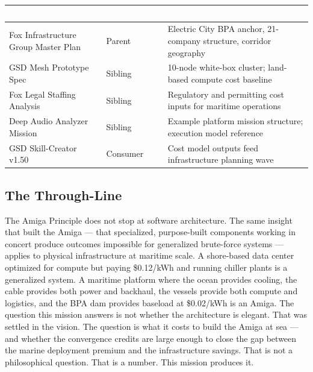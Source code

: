 \documentclass[11pt,letterpaper]{article}
\newcommand{\tableheader}[1]{\textbf{\sffamily\textcolor{white}{#1}}}
\newcommand{\stageheader}[2]{%
  \noindent\colorbox{#2}{\makebox[\textwidth][l]{%
    \textcolor{white}{\bfseries\sffamily\hspace{6pt}#1\hspace{6pt}}}}%
  \vspace{0.5em}\par%
}
\begin{document}
\begin{center}
\begin{tabularx}{\textwidth}{L{4.5cm}L{3cm}X}
\toprule
{}
\tableheader{Document} & \tableheader{Relationship} & \tableheader{Dependency} \\
\midrule
Fox Infrastructure Group Master Plan & Parent & Electric City BPA anchor, 21-company structure, corridor geography \\
GSD Mesh Prototype Spec & Sibling & 10-node white-box cluster; land-based compute cost baseline \\
Fox Legal Staffing Analysis & Sibling & Regulatory and permitting cost inputs for maritime operations \\
Deep Audio Analyzer Mission & Sibling & Example platform mission structure; execution model reference \\
GSD Skill-Creator v1.50 & Consumer & Cost model outputs feed infrastructure planning wave \\
\bottomrule
\end{tabularx}
\end{center}

\subsection{The Through-Line}

The Amiga Principle does not stop at software architecture. The same insight that built
the Amiga --- that specialized, purpose-built components working in concert produce outcomes
impossible for generalized brute-force systems --- applies to physical infrastructure at
maritime scale. A shore-based data center optimized for compute but paying \$0.12/kWh and
running chiller plants is a generalized system. A maritime platform where the ocean provides
cooling, the cable provides both power and backhaul, the vessels provide both compute and
logistics, and the BPA dam provides baseload at \$0.02/kWh is an Amiga. The question this
mission answers is not whether the architecture is elegant. That was settled in the vision.
The question is what it costs to build the Amiga at sea --- and whether the convergence
credits are large enough to close the gap between the marine deployment premium and the
infrastructure savings. That is not a philosophical question. That is a number. This mission
produces it.

\newpage
\stageheader{STAGE 2 --- RESEARCH REFERENCE}{secondary}
\end{document}
